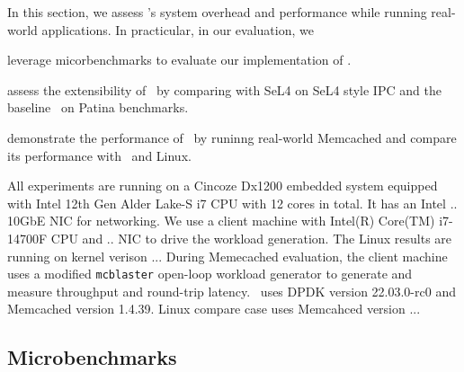 In this section, we assess \name 's system overhead and performance while running real-world applications.
In practicular, in our evaluation, we
\begin{inparaenum}[(1)]
\item leverage micorbenchmarks to evaluate our implementation of \name .
\item assess the extensibility of \name\ by comparing with SeL4 on SeL4 style IPC and the baseline \cos\ on Patina benchmarks.
\item demonstrate the performance of \name\ by runinng real-world Memcached and compare its performance with \cos\ and Linux.
\end{inparaenum}

All experiments are running on a Cincoze Dx1200 embedded system equipped with Intel 12th Gen Alder Lake-S i7 CPU with 12 cores in total.
It has an Intel .. 10GbE NIC for networking.
We use a client machine with Intel(R) Core(TM) i7-14700F CPU and .. NIC to drive the workload generation.
The Linux results are running on kernel verison ...
During Memecached evaluation, the client machine uses a modified {\tt mcblaster} open-loop workload generator to generate and measure throughput and round-trip latency.
\name\ uses DPDK version 22.03.0-rc0 and Memcached version 1.4.39.
Linux compare case uses Memcahced version ...

\subsection{Microbenchmarks}
\label{ss:eval_micro}



